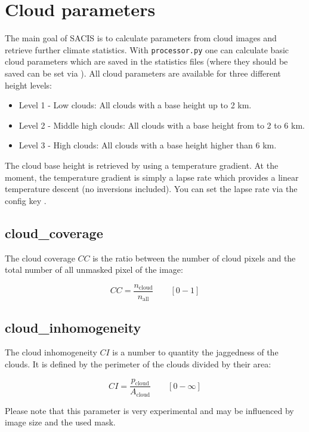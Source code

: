 \documentclass[11pt,a4paper]{article}
\begin{document}
\section{Cloud parameters}
\label{sec:cloud-parameters}
The main goal of SACIS is to calculate parameters from cloud images and retrieve further climate statistics. With \texttt{processor.py} one can calculate basic cloud parameters which are saved in the statistics files (where they should be saved can be set via ). All cloud parameters are available for three different height levels:
\begin{itemize}
	\item Level 1 - Low clouds: All clouds with a base height up to 2 km.
	\item Level 2 - Middle high clouds: All clouds with a base height from to 2 to 6 km.
	\item Level 3 - High clouds: All clouds with a base height higher than 6 km.
\end{itemize}

The cloud base height is retrieved by using a temperature gradient. At the moment, the temperature gradient is simply a lapse rate which provides a linear temperature descent (no inversions included). You can set the lapse rate via the config key .

\subsection{cloud\_coverage}
The cloud coverage $CC$ is the ratio between the number of cloud pixels and the total number of all unmasked pixel of the image:

\begin{equation}
	CC = \frac{n_\text{cloud}}{n_\text{all}} \qquad [0 - 1]
\end{equation}

\subsection{cloud\_inhomogeneity}
The cloud inhomogeneity $CI$ is a number to quantity the jaggedness of the clouds. It is defined by the perimeter of the clouds divided by their area:

\begin{equation}
	CI = \frac{p_\text{cloud}}{A_\text{cloud}} \qquad [0 - \infty]
\end{equation}

Please note that this parameter is very experimental and may be influenced by image size and the used mask.
\end{document}
